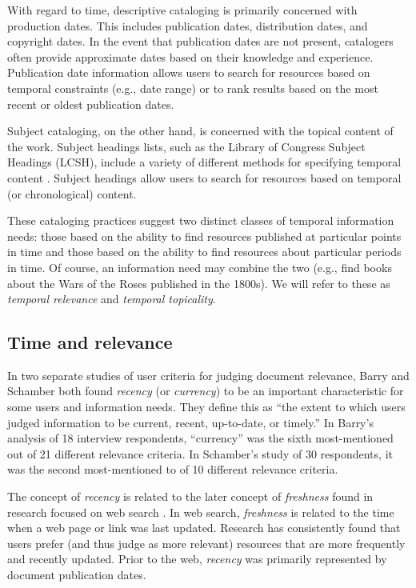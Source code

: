 \documentclass{sig-alternate}
\begin{document}
With regard to time, descriptive cataloging is primarily concerned with production dates. This includes publication dates, distribution dates, and copyright dates. In the event that publication dates are not present, catalogers often provide approximate dates based on their knowledge and experience.  Publication date information allows users to search for resources based on temporal constraints (e.g., date range) or to rank results based on the most recent or oldest publication dates. 

Subject cataloging, on the other hand, is concerned with the topical content of the work.  Subject headings lists, such as the Library of Congress Subject Headings (LCSH), include a variety of different methods for specifying temporal content \cite{Chan1972}.  Subject headings allow users to search for resources based on temporal (or chronological) content. 

These cataloging practices suggest two distinct classes of temporal information needs: those based on the ability to find resources published at particular points in time and those based on the ability to find resources about particular periods in time. Of course, an information need may combine the two (e.g., find books about the Wars of the Roses published in the 1800s). We will refer to these as \emph{temporal relevance} and \emph{temporal topicality}.
 
\subsection{Time and relevance}

In two separate studies of user criteria for judging document relevance, Barry and Schamber \cite{Barry1998} both found \emph{recency} (or \emph{currency}) to be an important characteristic for some users and information needs.  They define this as ``the extent to which users judged information to be current, recent, up-to-date, or timely.'' \cite{Barry1998}  In Barry's analysis of 18 interview respondents, ``currency'' was the sixth most-mentioned out of 21 different relevance criteria.  In Schamber's study of 30 respondents, it was the second most-mentioned to of 10 different relevance criteria. 

The concept of \emph{recency} is related to the later concept of \emph{freshness} found in research focused on web search \cite{Dai}. In web search, \emph{freshness} is related to the time when a web page or link was last updated. \cite{Berberich2005}  Research has consistently found that users prefer (and thus judge as more relevant) resources that are more frequently and recently updated.  Prior to the web, \emph{recency} was primarily represented by document publication dates. 
\end{document}
